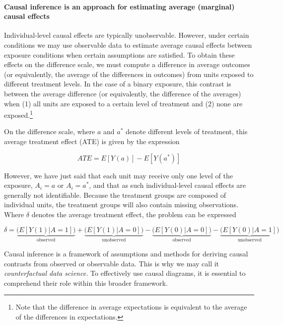 \documentclass[
  singlecolumn]{article}
\let\oldparagraph\paragraph
\renewcommand{\paragraph}[1]{\oldparagraph{#1}\mbox{}}
\begin{document}
\hypertarget{causal-inference-is-an-approach-for-estimating-average-marginal-causal-effects}{%
\paragraph{Causal inference is an approach for estimating average
(marginal) causal
effects}\label{causal-inference-is-an-approach-for-estimating-average-marginal-causal-effects}}

Individual-level causal effects are typically unobservable. However,
under certain conditions we may use observable data to estimate average
causal effects between exposure conditions when certain assumptions are
satisfied. To obtain these effects on the difference scale, we must
compute a difference in average outcomes (or equivalently, the average
of the differences in outcomes) from units exposed to different
treatment levels. In the case of a binary exposure, this contrast is
between the average difference (or equivalently, the difference of the
averages) when (1) all units are exposed to a certain level of treatment
and (2) none are exposed.\footnote{Note that the difference in average
  expectations is equivalent to the average of the differences in
  expectations.}

On the difference scale, where \(a\) and \(a^*\) denote different levels
of treatment, this average treatment effect (ATE) is given by the
expression

\[
ATE = E[Y(a)] - E[Y(a^*)]
\]

However, we have just said that each unit may receive only one level of
the exposure, \(A_i = a\) or \(A_i = a^*\), and that as such
individual-level causal effects are generally not identifiable. Because
the treatment groups are composed of individual units, the treatment
groups will also contain missing observations. Where \(\delta\) denotes
the average treatment effect, the problem can be expressed

\[
\delta = \underbrace{\big(E[Y(1)|A = 1]\big)}_{\text{observed}} + \underbrace{\big(E[Y(1)|A = 0]\big)}_{\text{unobserved}} - \underbrace{\big(E[Y(0)|A = 0]\big)}_{\text{observed}}  - \underbrace{\big(E[Y(0)|A = 1]\big)}_{\text{unobserved}}
\]

Causal inference is a framework of assumptions and methods for deriving
causal contrasts from observed or observable data. This is why we may
call it \emph{counterfactual data science.} To effectively use causal
diagrams, it is essential to comprehend their role within this broader
framework.
\end{document}

